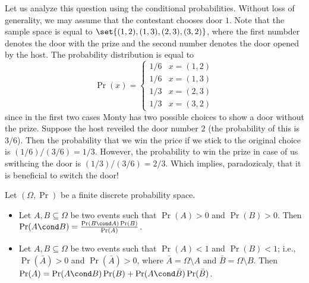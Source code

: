 Let us analyze this question using the conditional probabilities. Without loss
of generality, we may assume that the contestant chooses door $1$.
Note that the sample space is equal to $\set{(1, 2), (1, 3), (2, 3), (3, 2)}$,
where the first numbder denotes the door with the prize and the second number
denotes the door opened by the host. The probability distribution is equal to 
\[
  \Pr(x) = 
  \begin{cases}
    1 / 6 & x = (1, 2) \\
    1 / 6 & x = (1, 3) \\
    1 / 3 & x = (2, 3) \\
    1 / 3 & x = (3, 2)
  \end{cases}
\]
since in the first two cases Monty has two possible choices to show a door
without the prize.
Suppose the host reveiled the door number $2$ (the probability of this is
$3 / 6$). Then the probability that we win the price if we stick to the original
choice is $(1 / 6) / (3 / 6) = 1 / 3$. However, the probability to win the prize
in case of us swithcing the door is $(1 / 3) / (3 / 6) = 2 / 3$. Which implies,
paradozicaly, that it is beneficial to switch the door!

\begin{theorem}
  Let $(\Omega, \Pr)$ be a finite discrete probability space. 
  \begin{itemize}
    \item Let $A, B \subseteq \Omega$ be two events such that $\Pr(A) > 0$ and
      $\Pr(B) > 0$. Then $\Pr(A \cond B) = \frac{\Pr(B \cond A) \Pr(B)}{\Pr(A)}$.
    \item Let $A, B \subseteq \Omega$ be two events such that $\Pr(A) < 1$ and
      $\Pr(B) < 1$; i.e., $\Pr(\bar{A}) > 0$ and $\Pr(\bar{A}) > 0$, where
      $\bar{A} = \Omega \setminus A$ and $\bar{B} = \Omega \setminus B$.
      Then $\Pr(A) = \Pr(A \cond B)\Pr(B) + \Pr(A \cond \bar{B})\Pr(\bar{B})$.
  \end{itemize}
\end{theorem}


